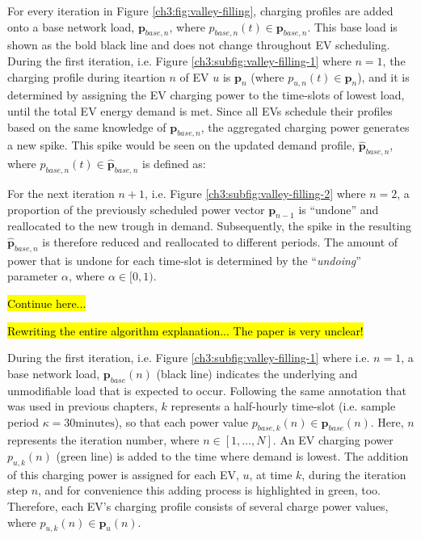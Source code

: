 For every iteration in Figure \ref{ch3:fig:valley-filling}, charging profiles are added onto a base network load, $\textbf{p}_{base,n}$, where $p_{base,n}(t) \in \textbf{p}_{base,n}$.
This base load is shown as the bold black line and does not change throughout EV scheduling.
During the first iteration, i.e. Figure \ref{ch3:subfig:valley-filling-1} where $n=1$, the charging profile during iteartion $n$ of EV $u$ is $\textbf{p}_n$ (where $p_{u,n}(t) \in \textbf{p}_n$), and it is determined by assigning the EV charging power to the time-slots of lowest load, until the total EV energy demand is met.
Since all EVs schedule their profiles based on the same knowledge of $\textbf{p}_{base,n}$, the aggregated charging power generates a new spike.
This spike would be seen on the updated demand profile, $\hat{\textbf{p}}_{base, n}$, where $\hat{p}_{base, n}(t) \in \hat{\textbf{p}}_{base, n}$ is defined as:



For the next iteration $n+1$, i.e. Figure \ref{ch3:subfig:valley-filling-2} where $n=2$, a proportion of the previously scheduled power vector $\textbf{p}_{n-1}$ is ``undone'' and reallocated to the new trough in demand.
Subsequently, the spike in the resulting $\hat{\textbf{p}}_{base, n}$ is therefore reduced and reallocated to different periods.
The amount of power that is undone for each time-slot is determined by the ``\textit{undoing}'' parameter $\alpha$, where $\alpha \in [0, 1)$.


\hl{Continue here...}

\hl{Rewriting the entire algorithm explanation... The paper is very unclear!}

During the first iteration, i.e. Figure \ref{ch3:subfig:valley-filling-1} where i.e. $n=1$, a base network load, $\textbf{p}_{base}(n)$ (black line) indicates the underlying and unmodifiable load that is expected to occur.
Following the same annotation that was used in previous chapters, $k$ represents a half-hourly time-slot (i.e. sample period $\kappa = 30\text{minutes}$), so that each power value $p_{base,k}(n) \in \textbf{p}_{base}(n)$.
Here, $n$ represents the iteration number, where $n \in [1, \dots, N]$.
An EV charging power $p_{u,k}(n)$ (green line) is added to the time where demand is lowest.
The addition of this charging power is assigned for each EV, $u$, at time $k$, during the iteration step $n$, and for convenience this adding process is highlighted in green, too.
Therefore, each EV's charging profile consists of several charge power values, where $p_{u,k}(n) \in \textbf{p}_u(n)$.



